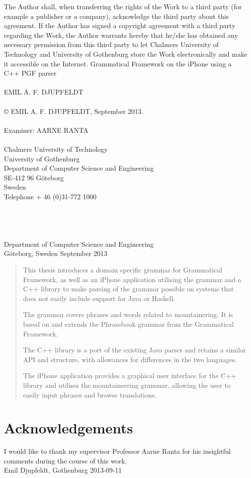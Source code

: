 The Author shall, when transferring the rights of the Work to a third party (for example a publisher or a company), acknowledge the third party about this agreement. If the Author has signed a copyright agreement with a third party regarding the Work, the Author warrants hereby that he/she has obtained any necessary permission from this third party to let Chalmers University of Technology and University of Gothenburg  store the Work electronically and make it accessible on the Internet.
\vfill
Grammatical Framework on the iPhone using a C++ PGF parser\\
\\
EMIL A. F. DJUPFELDT\\
\\
© EMIL A. F. DJUPFELDT, September 2013.\\
\\
Examiner: AARNE RANTA\\
\\
Chalmers University of Technology\\
University of Gothenburg\\
Department of Computer Science and Engineering\\
SE-412 96 Göteborg\\
Sweden\\
Telephone + 46 (0)31-772 1000\\
\\
\\
\\
\\
Department of Computer Science and Engineering\\
Göteborg, Sweden September 2013

\newpage
\clearpage
\thispagestyle{empty}

\begin{abstract}
This thesis introduces a domain specific grammar for Grammatical Framework, as well as an iPhone application utilising the grammar and a C++ library to make parsing of the grammar possible on systems that does not easily include support for Java or Haskell.

The grammar covers phrases and words related to mountainering. It is based on and extends the Phrasebook grammar from the Grammatical Framework.

The C++ library is a port of the existing Java parser and retains a similar API and structure, with allowances for differences in the two languages.

The iPhone application provides a graphical user interface for the C++ library and utilises the mountaineering grammar, allowing the user to easily input phrases and browse translations.
\end{abstract}

\newpage
\clearpage
\mbox{}
\newpage
\clearpage
\thispagestyle{empty}
\section*{Acknowledgements}
I would like to thank my supervisor Professor Aarne Ranta for his insightful comments during the course of this work.\\[1cm]

\hfill Emil Djupfeldt, Gothenburg 2013-09-11
\newpage
\clearpage
\mbox{}